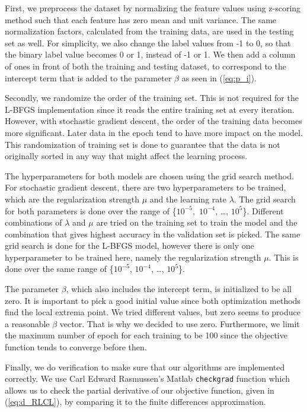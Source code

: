 \documentclass{article} %
\begin{document}
First, we preprocess the dataset by normalizing the feature values using z-scoring method such that each feature has zero mean and unit variance. The same normalization factors, calculated from the training data, are used in the testing set as well. For simplicity, we also change the label values from -1 to 0, so that the binary label value becomes 0 or 1, instead of -1 or 1. We then add a column of ones in front of both the training and testing dataset, to correspond to the intercept term that is added to the parameter $\beta$ as seen in (\ref{eq:p_i}).

Secondly, we randomize the order of the training set. This is not required for the L-BFGS implementation since it reads the entire training set at every iteration. However, with stochastic gradient descent, the order of the training data becomes more significant. Later data in the epoch tend to have more impact on the model. This randomization of training set is done to guarantee that the data is not originally sorted in any way that might affect the learning process.

The hyperparameters for both models are chosen using the grid search method. For stochastic gradient descent, there are two hyperparameters to be trained, which are the regularization strength $\mu$ and the learning rate $\lambda$. The grid search for both parameters is done over the range of \{$10^{-5},$ $10^{-4}$, \ldots, $10^5$\}. Different combinations of $\lambda$ and $\mu$ are tried on the training set to train the model and the combination that gives highest accuracy in the validation set is picked. The same grid search is done for the L-BFGS model, however there is only one hyperparameter to be trained here, namely the regularization strength $\mu$. This is done over the same range of \{$10^{-5}$, $10^{-4}$, \ldots, $10^5$\}.

The parameter $\beta$, which also includes the intercept term, is initialized to be all zero. It is important to pick a good initial value since both optimization methods find the local extrema point. We tried different values, but zero seems to produce a reasonable $\beta$ vector. That is why we decided to use zero. Furthermore, we limit the maximum number of epoch for each training to be 100 since the objective function tends to converge before then.

Finally, we do verification to make sure that our algorithms are implemented correctly. We use Carl Edward Rasmussen's Matlab {\tt checkgrad} function {\cite{checkgrad}} which allows us to check the partial derivative of our objective function, given in (\ref{eq:d_RLCL}), by comparing it to the finite differences approximation.
\end{document}

